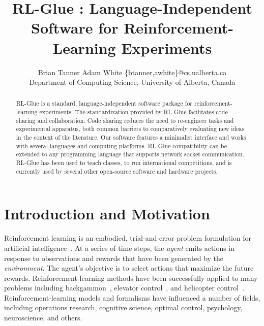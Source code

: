 \documentclass[twoside,11pt]{article}
\begin{document}
\title{RL-Glue : Language-Independent Software for Reinforcement-Learning Experiments}


\author{\name Brian Tanner \AND Adam White  \email \{btanner,awhite\}@cs.ualberta.ca \\
       \addr Department of Computing Science, University of Alberta, Canada}


\maketitle

\begin{abstract}
RL-Glue is a standard, language-independent software package for reinforcement-learning experiments.  The standardization provided by RL-Glue facilitates code sharing and collaboration.  Code sharing reduces the need to re-engineer tasks and experimental apparatus, both common barriers to comparatively evaluating new ideas in the context of the literature.  Our software features a minimalist interface and works with several languages and computing platforms. RL-Glue compatibility can be extended to any programming language that supports network socket communication. RL-Glue has been used to teach classes, to run international competitions, and is currently used by several other open-source software and hardware projects.
\end{abstract}

\section{Introduction and Motivation}
\vspace{-0.2cm}
Reinforcement learning is an embodied, trial-and-error problem formulation for artificial intelligence~\citep{rlbook, rlsurvey,ndp}.  At a series of time steps, the {\it agent} emits actions in response to observations and rewards that have been generated by the {\it environment}.  The agent's objective is to select actions that maximize the future rewards.  Reinforcement-learning methods have been successfully applied to many problems including %
  backgammon~\citep{tesauro:nc94}, elevator control~\citep{crites:mlj98},
and helicopter control~\citep{ng:iser04}.  
Reinforcement-learning models and formalisms have influenced a number of fields, including operations research, cognitive science, optimal control, psychology, neuroscience, and others.
\end{document}
